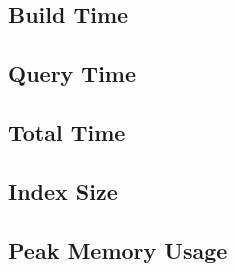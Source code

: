 \subsection*{Build Time}


\subsection*{Query Time}


\subsection*{Total Time}


\subsection*{Index Size}


\subsection*{Peak Memory Usage}


